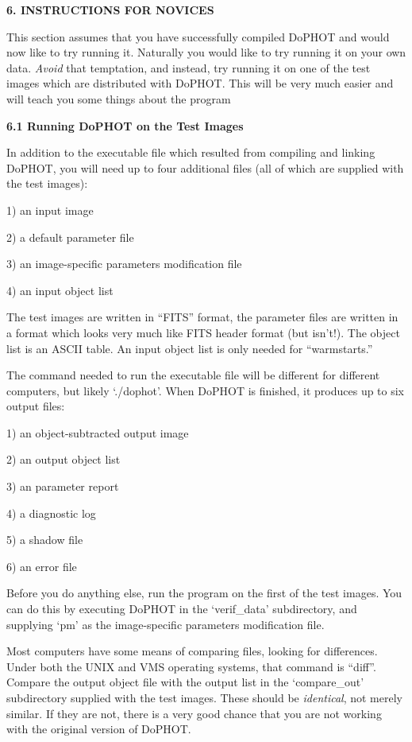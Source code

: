 \centerline{\bf 6. INSTRUCTIONS FOR NOVICES}

This section assumes that you have successfully compiled
DoPHOT and would now like to try running it. Naturally
you would like to try running it on your own data.
{\it Avoid} that temptation, and instead, try running it
on one of the test images which are distributed with
DoPHOT. This will be very much easier and will teach
you some things about the program

\centerline{\bf 6.1  Running DoPHOT on the Test Images}

In addition to the executable file which resulted from
compiling and linking DoPHOT, you will need up to four additional
files (all of which are supplied with the test images):

\item{1)} an input image
\item{2)} a default parameter file
\item{3)} an image-specific parameters modification file
\item{4)} an input object list

The test images are written in ``FITS'' format, the parameter
files are written in a format which looks very much like FITS header
format (but isn't!).  
The object list is an ASCII table.  An input object list is only 
needed for ``warmstarts.''

The command needed to run the executable file will be different
for different computers, but likely `./dophot'.  When DoPHOT is 
finished, it produces up to six output files:
\item{1)} an object-subtracted output image
\item{2)} an output object list
\item{3)} an parameter report
\item{4)} a diagnostic log
\item{5)} a shadow file
\item{6)} an error file

Before you do anything else, run the program on the first of the test
images.  
You can do this by executing DoPHOT in the `verif\_data'
subdirectory, and supplying `pm' as the image-specific parameters 
modification file.

Most computers have some means of comparing files, looking
for differences.  Under both the UNIX and VMS operating systems, that
command is ``diff''.  Compare the output object file with the output list in 
the `compare\_out' subdirectory supplied with the test images.  These 
should be {\it identical}, not merely similar.  If they are not, there is a very 
good chance that you are not working with the original version of DoPHOT.


